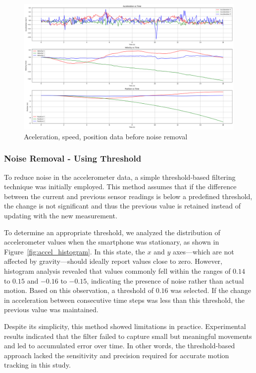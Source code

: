 \documentclass{article}
\begin{document}
\FloatBarrier
\begin{figure}[h]
    \centering
    \includegraphics[width=\textwidth]{2_1_6_1.png}
    \caption{Aceleration, speed, position data before noise removal}
    \label{fig:integration_drift}
\end{figure}


\FloatBarrier
\subsubsection{Noise Removal - Using Threshold}

To reduce noise in the accelerometer data, a simple threshold-based filtering technique was initially employed. This method assumes that if the difference between the current and previous sensor readings is below a predefined threshold, the change is not significant and thus the previous value is retained instead of updating with the new measurement.

To determine an appropriate threshold, we analyzed the distribution of accelerometer values when the smartphone was stationary, as shown in Figure~\ref{fig:accel_histogram}. In this state, the $x$ and $y$ axes—which are not affected by gravity—should ideally report values close to zero. However, histogram analysis revealed that values commonly fell within the ranges of $0.14$ to $0.15$ and $-0.16$ to $-0.15$, indicating the presence of noise rather than actual motion. Based on this observation, a threshold of $0.16$ was selected. If the change in acceleration between consecutive time steps was less than this threshold, the previous value was maintained.

Despite its simplicity, this method showed limitations in practice. Experimental results indicated that the filter failed to capture small but meaningful movements and led to accumulated error over time. In other words, the threshold-based approach lacked the sensitivity and precision required for accurate motion tracking in this study.
\end{document}
